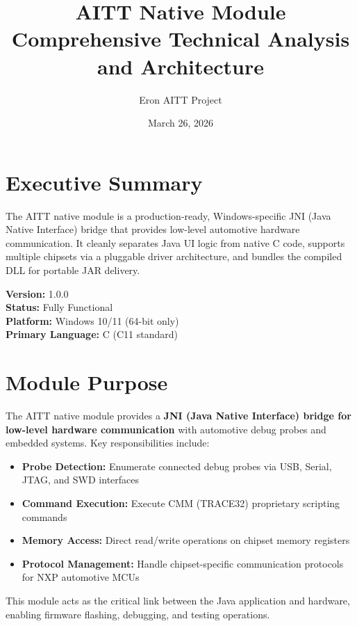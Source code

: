 \documentclass[12pt,a4paper]{article}
\title{\textbf{AITT Native Module} \\ Comprehensive Technical Analysis and Architecture}
\author{Eron AITT Project}
\date{March 26, 2026}
\begin{document}
\maketitle
\newpage

\tableofcontents
\newpage

\section{Executive Summary}

The AITT native module is a production-ready, Windows-specific JNI (Java Native Interface) bridge that provides low-level automotive hardware communication. It cleanly separates Java UI logic from native C code, supports multiple chipsets via a pluggable driver architecture, and bundles the compiled DLL for portable JAR delivery.

\textbf{Version:} 1.0.0 \\
\textbf{Status:} Fully Functional \\
\textbf{Platform:} Windows 10/11 (64-bit only) \\
\textbf{Primary Language:} C (C11 standard) \\

\section{Module Purpose}

The AITT native module provides a \textbf{JNI (Java Native Interface) bridge for low-level hardware communication} with automotive debug probes and embedded systems. Key responsibilities include:

\begin{itemize}
    \item \textbf{Probe Detection:} Enumerate connected debug probes via USB, Serial, JTAG, and SWD interfaces
    \item \textbf{Command Execution:} Execute CMM (TRACE32) proprietary scripting commands
    \item \textbf{Memory Access:} Direct read/write operations on chipset memory registers
    \item \textbf{Protocol Management:} Handle chipset-specific communication protocols for NXP automotive MCUs
\end{itemize}

This module acts as the critical link between the Java application and hardware, enabling firmware flashing, debugging, and testing operations.
\end{document}
